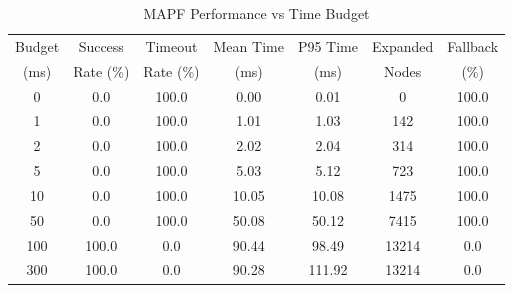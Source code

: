 \begin{table}[h]
\centering
\caption{MAPF Performance vs Time Budget}
\begin{tabular}{ccccccc}
\hline
Budget & Success & Timeout & Mean Time & P95 Time & Expanded & Fallback \\
(ms) & Rate (\%) & Rate (\%) & (ms) & (ms) & Nodes & (\%) \\
\hline
0 & 0.0 & 100.0 & 0.00 & 0.01 & 0 & 100.0 \\
1 & 0.0 & 100.0 & 1.01 & 1.03 & 142 & 100.0 \\
2 & 0.0 & 100.0 & 2.02 & 2.04 & 314 & 100.0 \\
5 & 0.0 & 100.0 & 5.03 & 5.12 & 723 & 100.0 \\
10 & 0.0 & 100.0 & 10.05 & 10.08 & 1475 & 100.0 \\
50 & 0.0 & 100.0 & 50.08 & 50.12 & 7415 & 100.0 \\
100 & 100.0 & 0.0 & 90.44 & 98.49 & 13214 & 0.0 \\
300 & 100.0 & 0.0 & 90.28 & 111.92 & 13214 & 0.0 \\
\hline
\end{tabular}
\end{table}
